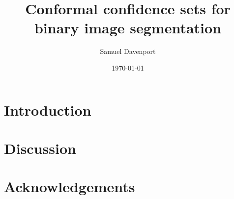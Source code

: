 \documentclass[12pt]{article}
\title{Conformal confidence sets for binary image segmentation}
\author{Samuel Davenport}
\date{\today}
\theoremstyle{definition}
\begin{document}
	
\maketitle

\begin{abstract}
	
\end{abstract}

\section{Introduction}




\section{Discussion}


\section*{Acknowledgements}





%
\end{document}
